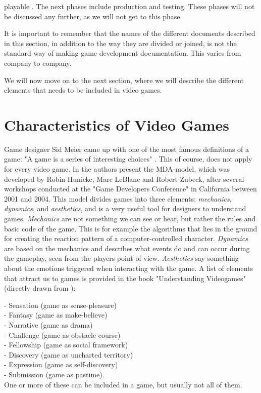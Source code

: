 playable \cite{understandingvg}. The next phases include production and testing. These phases will not be discussed any further, as we will not get to this phase. 

It is important to remember that the names of the different documents described in this section, in addition to the way they are divided or joined, is not the standard way of making game development documentation. This varies from company to company. 

We will now move on to the next section, where we will describe the different elements that needs to be included in video games.

\section{Characteristics of Video Games}

Game designer Sid Meier came up with one of the most famous definitions of a game: "A game is a series of interesting choices" \cite{understandingvg}. This of course, does not apply for every video game. In \cite{understandingvg} the authors present the MDA-model, which was developed by Robin Hunicke, Marc LeBlanc and Robert Zubeck, after several workshops conducted at the "Game Developers Conference" in California between 2001 and 2004. This model divides games into three elements: \emph{mechanics}, \emph{dynamics}, and \emph{aesthetics}, and is a very useful tool for designers to understand games. \emph{Mechanics} are not something we can see or hear, but rather the rules and basic code of the game. This is for example the algorithms that lies in the ground for creating the reaction pattern of a computer-controlled character. \emph{Dynamics} are based on the mechanics and describes what events do and can occur during the gameplay, seen from the players point of view. \emph{Aesthetics} say something about the emotions triggered when interacting with the game. A list of elements  that attract us to games is provided in the book "Understanding Videogames" (directly drawn from \cite{understandingvg}): 

- Sensation (game as sense-pleasure)\\
- Fantasy (game as make-believe)\\
- Narrative (game as drama)\\
- Challenge (game as obstacle course)\\
- Fellowship (game as social framework)\\
- Discovery (game as uncharted territory)\\
- Expression (game as self-discovery)\\
- Submission (game as pastime).\\
One or more of these can be included in a game, but usually not all of them.


